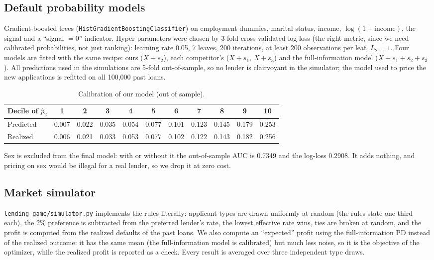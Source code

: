 \documentclass[11pt,a4paper]{article}
\newcommand{\code}[1]{\texttt{#1}}
\begin{document}
\subsection{Default probability models}
Gradient-boosted trees (\code{HistGradientBoostingClassifier}) on employment dummies, marital status, income,
$\log(1+\text{income})$, the signal and a ``signal $=0$'' indicator. Hyper-parameters were chosen by 3-fold
cross-validated log-loss (the right metric, since we need calibrated probabilities, not just ranking):
learning rate 0.05, 7 leaves, 200 iterations, at least 200 observations per leaf, $L_2 = 1$. Four models are
fitted with the same recipe: ours ($X + s_2$), each competitor's ($X + s_1$, $X + s_3$) and the full-information
model ($X + s_1 + s_2 + s_3$). All predictions used in the simulations are 5-fold out-of-sample, so no lender is
clairvoyant in the simulator; the model used to price the new applications is refitted on all 100,000 past loans.

\begin{table}[h]\centering\small
\begin{tabular}{lcccccccccc}
\toprule
Decile of $\hat p_2$ & 1 & 2 & 3 & 4 & 5 & 6 & 7 & 8 & 9 & 10\\
\midrule
Predicted & 0.007 & 0.022 & 0.035 & 0.054 & 0.077 & 0.101 & 0.123 & 0.145 & 0.179 & 0.253\\
Realized  & 0.006 & 0.021 & 0.033 & 0.053 & 0.077 & 0.102 & 0.122 & 0.143 & 0.182 & 0.256\\
\bottomrule
\end{tabular}
\caption{Calibration of our model (out of sample).}
\label{tab:calib}
\end{table}

Sex is excluded from the final model: with or without it the out-of-sample AUC is 0.7349 and the log-loss
0.2908. It adds nothing, and pricing on sex would be illegal for a real lender, so we drop it at zero cost.

\subsection{Market simulator}
\code{lending\_game/simulator.py} implements the rules literally: applicant types are drawn uniformly at random
(the rules state one third each), the 2\% preference is subtracted from the preferred lender's rate, the lowest
effective rate wins, ties are broken at random, and the profit is computed from the realized defaults of the past
loans. We also compute an ``expected'' profit using the full-information PD instead of the realized outcome: it has
the same mean (the full-information model is calibrated) but much less noise, so it is the objective of the
optimizer, while the realized profit is reported as a check. Every result is averaged over three independent
type draws.
\end{document}
